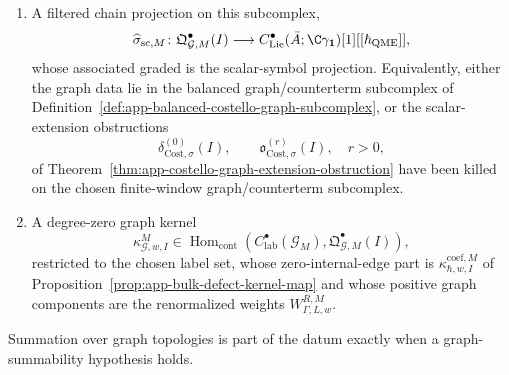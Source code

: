 \begin{defn}
\begin{enumerate}[label=(F\arabic*)]
    \item A filtered chain projection on this subcomplex,
    \[
      \widehat\sigma_{\mathrm{sc},M}\colon
      \mathfrak Q^\bullet_{\mathcal G,M}(I)
      \longrightarrow
      C^\bullet_{\mathrm{Lie}}(\bar A;\C\gamma_{\mathbf 1})[1][[\hbar_{\mathrm{QME}}]],
    \]
    whose associated graded is the scalar-symbol projection.  Equivalently,
    either the graph data lie in the balanced graph/counterterm
    subcomplex of
    Definition~\ref{def:app-balanced-costello-graph-subcomplex}, or the
    scalar-extension obstructions
    \[
      \delta^{(0)}_{\mathrm{Cost},\sigma}(I),
      \qquad
      \mathfrak o^{(r)}_{\mathrm{Cost},\sigma}(I),\quad r>0,
    \]
    of Theorem~\ref{thm:app-costello-graph-extension-obstruction} have been
    killed on the chosen finite-window graph/counterterm subcomplex.

    \item A degree-zero graph kernel
    \[
      \kappa^M_{\mathcal G,w,I}\in
      \operatorname{Hom}_{\mathrm{cont}}\!\left(
        C^\bullet_{\mathrm{lab}}(\mathcal G_M),
        \mathfrak Q^\bullet_{\mathcal G,M}(I)\right),
    \]
    restricted to the chosen label set, whose zero-internal-edge part
    is \(\kappa^{\mathrm{coef},M}_{\hbar,w,I}\) of
    Proposition~\ref{prop:app-bulk-defect-kernel-map} and whose positive
    graph components are the renormalized weights
    \(W^{R,M}_{\Gamma,L,w}\).
  \end{enumerate}
  Summation over graph topologies is part of the datum exactly when a
  graph-summability hypothesis holds.
\end{defn}

